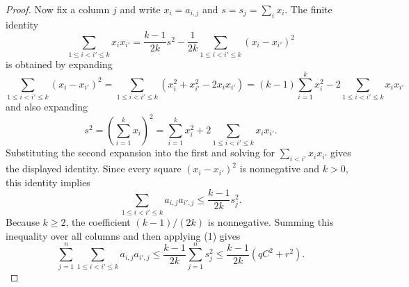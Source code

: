 \begin{proof}
Now fix a column $j$ and write $x_i=a_{i,j}$ and $s=s_j=\sum_i x_i$.
The finite identity
\[
\sum_{1\le i<i'\le k}x_ix_{i'}
=\frac{k-1}{2k}s^2-\frac{1}{2k}
\sum_{1\le i<i'\le k}(x_i-x_{i'})^2
\]
is obtained by expanding
\[
\sum_{1\le i<i'\le k}(x_i-x_{i'})^2
=\sum_{1\le i<i'\le k}(x_i^2+x_{i'}^2-2x_ix_{i'})
=(k-1)\sum_{i=1}^k x_i^2-2\sum_{1\le i<i'\le k}x_ix_{i'}
\]
and also expanding
\[
s^2=\left(\sum_{i=1}^k x_i\right)^2
=\sum_{i=1}^k x_i^2+2\sum_{1\le i<i'\le k}x_ix_{i'}.
\]
Substituting the second expansion into the first and solving for
$\sum_{i<i'}x_ix_{i'}$ gives the displayed identity.  Since every square
$(x_i-x_{i'})^2$ is nonnegative and $k>0$, this identity implies
\[
\sum_{1\le i<i'\le k}a_{i,j}a_{i',j}
\le \frac{k-1}{2k}s_j^2 .
\]
Because $k\ge2$, the coefficient $(k-1)/(2k)$ is nonnegative.  Summing this
inequality over all columns and then applying (1) gives
\[
\sum_{j=1}^n\sum_{1\le i<i'\le k}a_{i,j}a_{i',j}
\le \frac{k-1}{2k}\sum_{j=1}^n s_j^2
\le \frac{k-1}{2k}(qC^2+r^2).
\]
\end{proof}
